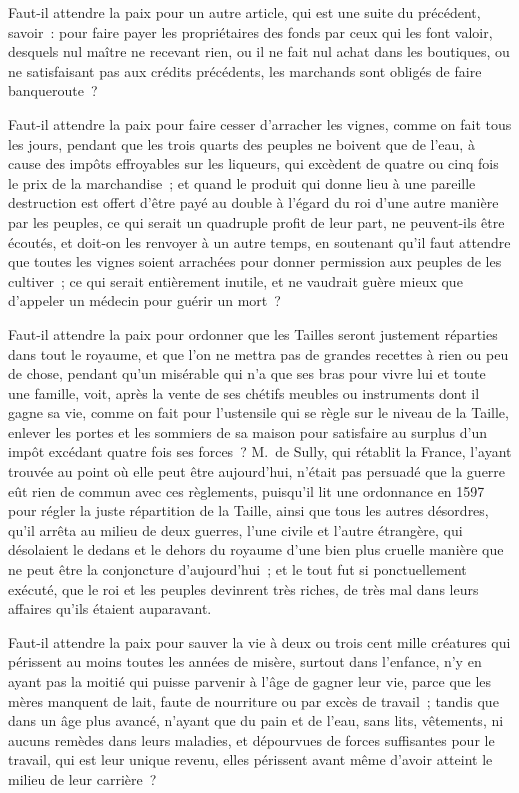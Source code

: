 \documentclass[french,twoside]{book} %
\begin{document}
Faut-il attendre la paix pour un autre article, qui est une suite du précédent, savoir : pour faire payer les propriétaires des fonds par ceux qui les font valoir, desquels nul maître ne recevant rien, ou il ne fait nul achat dans les boutiques, ou ne satisfaisant pas aux crédits précédents, les marchands sont obligés de faire banqueroute ?\par
Faut-il attendre la paix pour faire cesser d’arracher les vignes, comme on fait tous les jours, pendant que les trois quarts des peuples ne boivent que de l’eau, à cause des impôts effroyables sur les liqueurs, qui excèdent de quatre ou cinq fois le prix de la marchandise ; et quand le produit qui donne lieu à une pareille destruction est offert d’être payé au double à l’égard du roi d’une autre manière par les peuples, ce qui serait un quadruple profit de leur part, ne peuvent-ils être écoutés, et doit-on les renvoyer à un autre temps, en soutenant qu’il faut attendre que toutes les vignes soient arrachées pour donner permission aux peuples de les cultiver ; ce qui serait entièrement inutile, et ne vaudrait guère mieux que d’appeler un médecin pour guérir un mort ?\par
Faut-il attendre la paix pour ordonner que les Tailles seront justement réparties dans tout le royaume, et que l’on ne mettra pas de grandes recettes à rien ou peu de chose, pendant qu’un misérable qui n’a que ses bras pour vivre lui et toute une famille, voit, après la vente de ses chétifs meubles ou instruments dont il gagne sa vie, comme on fait pour l’ustensile qui se règle sur le niveau de la Taille, enlever les portes et les sommiers de sa maison pour satisfaire au surplus d’un impôt excédant quatre fois ses forces ? M. de Sully, qui rétablit la France, l’ayant trouvée au point où elle peut être aujourd’hui, n’était pas persuadé que la guerre eût rien de commun avec ces règlements, puisqu’il lit une ordonnance en 1597 pour régler la juste répartition de la Taille, ainsi que tous les autres désordres, qu’il arrêta au milieu de deux guerres, l’une civile et l’autre étrangère, qui désolaient le dedans et le dehors du royaume d’une bien plus cruelle manière que ne peut être la conjoncture d’aujourd’hui ; et le tout fut si ponctuellement exécuté, que le roi et les peuples devinrent très riches, de très mal dans leurs affaires qu’ils étaient auparavant.\par
Faut-il attendre la paix pour sauver la vie à deux ou trois cent mille créatures qui périssent au moins toutes les années de misère, surtout dans l’enfance, n’y en ayant pas la moitié qui puisse parvenir à l’âge de gagner leur vie, parce que les mères manquent de lait, faute de nourriture ou par excès de travail ; tandis que dans un âge plus avancé, n’ayant que du pain et de l’eau, sans lits, vêtements, ni aucuns remèdes dans leurs maladies, et dépourvues de forces suffisantes pour le travail, qui est leur unique revenu, elles périssent avant même d’avoir atteint le milieu de leur carrière ?\par
\end{document}
